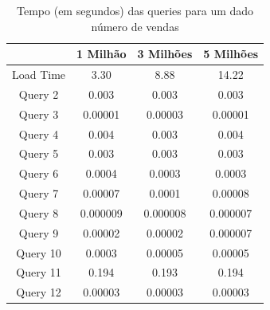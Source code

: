 \documentclass[a4paper]{report}
\begin{document}
\begin{table}[H]
    \begin{center}
        \begin{tabular}{| c | c | c | c |}
            \hline
            & 1 Milhão & 3 Milhões & 5 Milhões \\
            \hline
            Load Time & 3.30 & 8.88 & 14.22 \\
            \hline
            Query 2 & 0.003 & 0.003 & 0.003 \\
            \hline
            Query 3 & 0.00001 & 0.00003 & 0.00001 \\
            \hline
            Query 4 & 0.004 & 0.003 & 0.004 \\
            \hline
            Query 5 & 0.003 & 0.003 & 0.003 \\
            \hline
            Query 6 & 0.0004 & 0.0003 & 0.0003 \\
            \hline
            Query 7 & 0.00007 & 0.0001 & 0.00008 \\
            \hline
            Query 8 & 0.000009 & 0.000008 & 0.000007 \\
            \hline
            Query 9 & 0.00002 & 0.00002 & 0.000007 \\
            \hline
            Query 10 & 0.0003 & 0.00005 & 0.00005 \\
            \hline
            Query 11 & 0.194 & 0.193 & 0.194 \\
            \hline
            Query 12 & 0.00003 & 0.00003 & 0.00003 \\
            \hline

        \end{tabular}
        \caption{Tempo (em segundos) das queries para um dado número de vendas}
        \label{tab:benches}
    \end{center}
\end{table}
\end{document}
